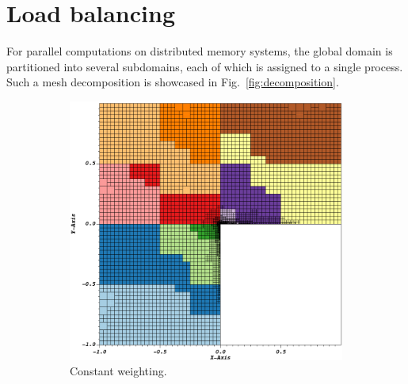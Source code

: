 \section{Load balancing}
\label{sec:heuristics}


For parallel computations on distributed memory systems, the global domain is partitioned into several subdomains, each of which is assigned to a single process. Such a mesh decomposition is showcased in Fig.~\ref{fig:decomposition}.

\begin{figure}
\centering
\begin{subfigure}[t]{.49\textwidth}
  \centering
  \includegraphics[width=\textwidth]{figures/results/corner-2d-error-hp-legendre-05_subdomain12.png}
  \caption{Constant weighting.}
\end{subfigure}
\begin{subfigure}[t]{.49\textwidth}
  \centering

\end{subfigure}
\end{figure}
